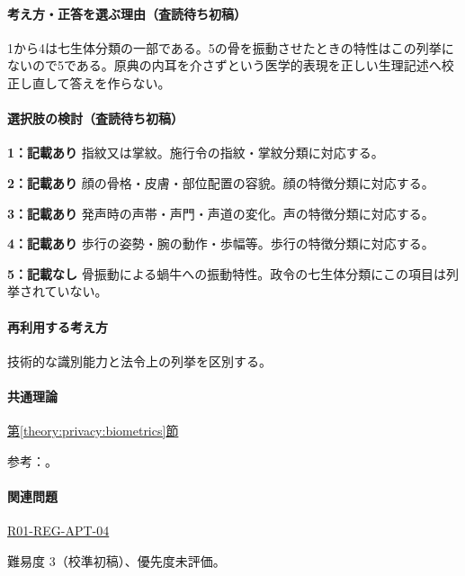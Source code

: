 \paragraph{考え方・正答を選ぶ理由（査読待ち初稿）} 1から4は七生体分類の一部である。5の骨を振動させたときの特性はこの列挙にないので5である。原典の内耳を介さずという医学的表現を正しい生理記述へ校正し直して答えを作らない。

\paragraph{選択肢の検討（査読待ち初稿）}\mbox{}\par

\noindent\textbf{1：記載あり} 指紋又は掌紋。施行令の指紋・掌紋分類に対応する。\par

\noindent\textbf{2：記載あり} 顔の骨格・皮膚・部位配置の容貌。顔の特徴分類に対応する。\par

\noindent\textbf{3：記載あり} 発声時の声帯・声門・声道の変化。声の特徴分類に対応する。\par

\noindent\textbf{4：記載あり} 歩行の姿勢・腕の動作・歩幅等。歩行の特徴分類に対応する。\par

\noindent\textbf{5：記載なし} 骨振動による蝸牛への振動特性。政令の七生体分類にこの項目は列挙されていない。\par

\paragraph{再利用する考え方} 技術的な識別能力と法令上の列挙を区別する。

\paragraph{共通理論} \hyperref[theory:privacy:biometrics]{第\ref*{theory:privacy:biometrics}節}

\par 参考：\cite{privacy_general}。

\paragraph{関連問題} \hyperref[q:r01-reg-apt-04]{R01-REG-APT-04}

\par 難易度 3（校準初稿）、優先度未評価。

